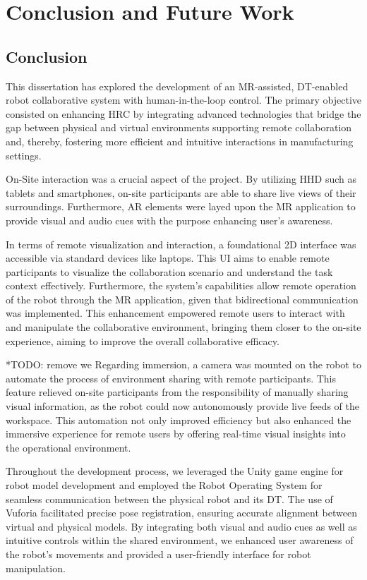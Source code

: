\chapter{Conclusion and Future Work}%

\section{Conclusion}

This dissertation has explored the development of an \ac{MR}-assisted, \ac{DT}-enabled robot collaborative system with human-in-the-loop control. The primary objective consisted on enhancing \ac{HRC} by integrating advanced technologies that bridge the gap between physical and virtual environments supporting remote collaboration and, thereby, fostering more efficient and intuitive interactions in manufacturing settings.

On-Site interaction was a crucial aspect of the project. By utilizing \ac{HHD} such as tablets and smartphones, on-site participants are able to share live views of their surroundings. Furthermore, \ac{AR} elements were layed upon the \ac{MR} application to provide visual and audio cues with the purpose enhancing user's awareness. 

In terms of remote visualization and interaction, a foundational 2D interface was accessible via standard devices like laptops. This \ac{UI} aims to enable remote participants to visualize the collaboration scenario and understand the task context effectively. Furthermore, the system's capabilities allow remote operation of the robot through the \ac{MR} application, given that bidirectional communication was implemented. This enhancement empowered remote users to interact with and manipulate the collaborative environment, bringing them closer to the on-site experience, aiming to improve the overall collaborative efficacy.


*TODO: remove we
Regarding immersion, a camera was mounted on the robot to automate the process of environment sharing with remote participants. This feature relieved on-site participants from the responsibility of manually sharing visual information, as the robot could now autonomously provide live feeds of the workspace. This automation not only improved efficiency but also enhanced the immersive experience for remote users by offering real-time visual insights into the operational environment.

Throughout the development process, we leveraged the Unity game engine for robot model development and employed the Robot Operating System for seamless communication between the physical robot and its \ac{DT}. The use of Vuforia facilitated precise pose registration, ensuring accurate alignment between virtual and physical models. By integrating both visual and audio cues as well as intuitive controls within the shared environment, we enhanced user awareness of the robot's movements and provided a user-friendly interface for robot manipulation.

